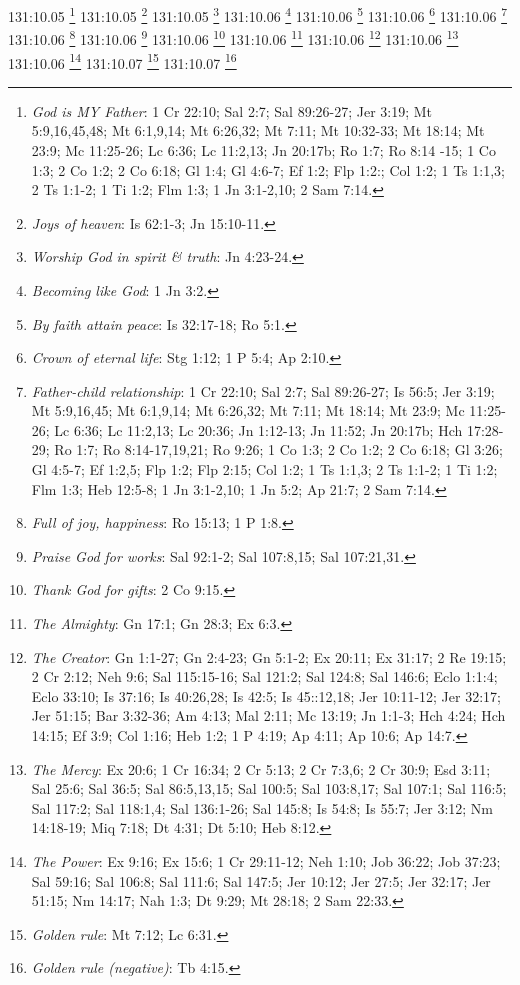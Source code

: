 {{{{{{{{{{{131:10.05 \footnote{\textit{God is MY Father}: 1 Cr 22:10; Sal 2:7; Sal 89:26-27; Jer 3:19; Mt 5:9,16,45,48; Mt 6:1,9,14; Mt 6:26,32; Mt 7:11; Mt 10:32-33; Mt 18:14; Mt 23:9; Mc 11:25-26; Lc 6:36; Lc 11:2,13; Jn 20:17b; Ro 1:7; Ro 8:14 -15; 1 Co 1:3; 2 Co 1:2; 2 Co 6:18; Gl 1:4; Gl 4:6-7; Ef 1:2; Flp 1:2:; Col 1:2; 1 Ts 1:1,3; 2 Ts 1:1-2; 1 Ti 1:2; Flm 1:3; 1 Jn 3:1-2,10; 2 Sam 7:14.}
131:10.05 \footnote{\textit{Joys of heaven}: Is 62:1-3; Jn 15:10-11.}
131:10.05 \footnote{\textit{Worship God in spirit & truth}: Jn 4:23-24.}
131:10.06 \footnote{\textit{Becoming like God}: 1 Jn 3:2.}
131:10.06 \footnote{\textit{By faith attain peace}: Is 32:17-18; Ro 5:1.}
131:10.06 \footnote{\textit{Crown of eternal life}: Stg 1:12; 1 P 5:4; Ap 2:10.}
131:10.06 \footnote{\textit{Father-child relationship}: 1 Cr 22:10; Sal 2:7; Sal 89:26-27; Is 56:5; Jer 3:19; Mt 5:9,16,45; Mt 6:1,9,14; Mt 6:26,32; Mt 7:11; Mt 18:14; Mt 23:9; Mc 11:25-26; Lc 6:36; Lc 11:2,13; Lc 20:36; Jn 1:12-13; Jn 11:52; Jn 20:17b; Hch 17:28-29; Ro 1:7; Ro 8:14-17,19,21; Ro 9:26; 1 Co 1:3; 2 Co 1:2; 2 Co 6:18; Gl 3:26; Gl 4:5-7; Ef 1:2,5; Flp 1:2; Flp 2:15; Col 1:2; 1 Ts 1:1,3; 2 Ts 1:1-2; 1 Ti 1:2; Flm 1:3; Heb 12:5-8; 1 Jn 3:1-2,10; 1 Jn 5:2; Ap 21:7; 2 Sam 7:14.}
131:10.06 \footnote{\textit{Full of joy, happiness}: Ro 15:13; 1 P 1:8.}
131:10.06 \footnote{\textit{Praise God for works}: Sal 92:1-2; Sal 107:8,15; Sal 107:21,31.}
131:10.06 \footnote{\textit{Thank God for gifts}: 2 Co 9:15.}
131:10.06 \footnote{\textit{The Almighty}: Gn 17:1; Gn 28:3; Ex 6:3.}
131:10.06 \footnote{\textit{The Creator}: Gn 1:1-27; Gn 2:4-23; Gn 5:1-2; Ex 20:11; Ex 31:17; 2 Re 19:15; 2 Cr 2:12; Neh 9:6; Sal 115:15-16; Sal 121:2; Sal 124:8; Sal 146:6; Eclo 1:1:4; Eclo 33:10; Is 37:16; Is 40:26,28; Is 42:5; Is 45::12,18; Jer 10:11-12; Jer 32:17; Jer 51:15; Bar 3:32-36; Am 4:13; Mal 2:11; Mc 13:19; Jn 1:1-3; Hch 4:24; Hch 14:15; Ef 3:9; Col 1:16; Heb 1:2; 1 P 4:19; Ap 4:11; Ap 10:6; Ap 14:7.}
131:10.06 \footnote{\textit{The Mercy}: Ex 20:6; 1 Cr 16:34; 2 Cr 5:13; 2 Cr 7:3,6; 2 Cr 30:9; Esd 3:11; Sal 25:6; Sal 36:5; Sal 86:5,13,15; Sal 100:5; Sal 103:8,17; Sal 107:1; Sal 116:5; Sal 117:2; Sal 118:1,4; Sal 136:1-26; Sal 145:8; Is 54:8; Is 55:7; Jer 3:12; Nm 14:18-19; Miq 7:18; Dt 4:31; Dt 5:10; Heb 8:12.}
131:10.06 \footnote{\textit{The Power}: Ex 9:16; Ex 15:6; 1 Cr 29:11-12; Neh 1:10; Job 36:22; Job 37:23; Sal 59:16; Sal 106:8; Sal 111:6; Sal 147:5; Jer 10:12; Jer 27:5; Jer 32:17; Jer 51:15; Nm 14:17; Nah 1:3; Dt 9:29; Mt 28:18; 2 Sam 22:33.}
131:10.07 \footnote{\textit{Golden rule}: Mt 7:12; Lc 6:31.}
131:10.07 \footnote{\textit{Golden rule (negative)}: Tb 4:15.}
}}}}}}}}}}}
